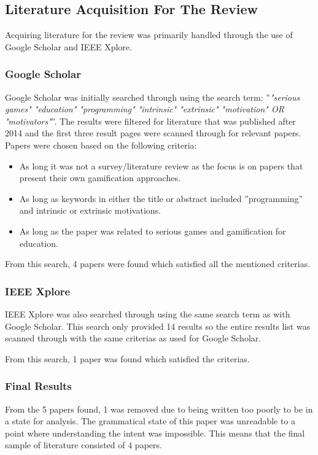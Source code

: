 \subsection{Literature Acquisition For The Review}
Acquiring literature for the review was primarily handled through the use of Google Scholar and IEEE Xplore.

\subsubsection{Google Scholar}
Google Scholar was initially searched through using the search term: ''\emph{"serious games" "education" "programming" "intrinsic" "extrinsic" "motivation" OR "motivators"}''. The results were filtered for literature that was published after 2014 and the first three result pages were scanned through for relevant papers. Papers were chosen based on the following criteria: 

\begin{itemize}
    \item As long it was not a survey/literature review as the focus is on papers that present their own gamification approaches.  
    \item As long as keywords in either the title or abstract included ''programming'' and intrinsic or extrinsic motivations. 
    \item As long as the paper was related to serious games and gamification for education. 
\end{itemize}

From this search, 4 papers were found which satisfied all the mentioned criterias. 

\subsubsection{IEEE Xplore}
IEEE Xplore was also searched through using the same search term as with Google Scholar. This search only provided 14 results so the entire results list was scanned through with the same criterias as used for Google Scholar. 

From this search, 1 paper was found which satisfied the criterias. 

\subsubsection{Final Results} 
From the 5 papers found, 1 was removed due to being written too poorly to be in a state for analysis. The grammatical state of this paper was unreadable to a point where understanding the intent was impossible. This means that the final sample of literature consisted of 4 papers. 
